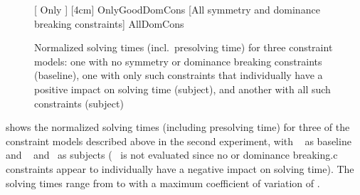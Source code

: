 
\begin{figure}
  \centering%

                      [%
                        Only
                      ]%
                      [4cm]%
                      {OnlyGoodDomCons}%
  \hfill%
                      [All symmetry and dominance breaking constraints]%
                      {AllDomCons}%

  \caption[%
            Plot for evaluating the impact on solving time made by different
            combinations of symmetry and dominance breaking constraints%
          ]%
          {%
            Normalized solving times (incl.\ presolving time) for three
            constraint models: one with no symmetry or dominance breaking
            constraints (baseline), one with only such constraints that
            individually have a positive impact on solving time (subject), and
            another with all such constraints (subject)%
          }
\end{figure}

 shows the normalized solving
times (including presolving time) for three of the \glspl{constraint model}
described above in the second experiment, with ~\modelC{} as \gls{baseline} and ~\modelD{}
and~\modelF{} as \glspl{subject} (~\modelE{} is not
evaluated since no  or \gls{dominance breaking.c}
\glspl{constraint} appear to individually have a negative impact on solving
time).
%
The solving times range from
\printMinSolvingTime{
  \SolvTechEnableOnlyGoodDomConsPrePlusSolvingTimeSpeedupNonePrePlusSolvingTimeAvgMin,
  \SolvTechEnableOnlyGoodDomConsPrePlusSolvingTimeSpeedupPrePlusSolvingTimeAvgMin,
  \SolvTechDisableAllDomConsPrePlusSolvingTimeSpeedupPrePlusSolvingTimeAvgMin
} to
\printMaxSolvingTime{
  \SolvTechEnableOnlyGoodDomConsPrePlusSolvingTimeSpeedupNonePrePlusSolvingTimeAvgMax,
  \SolvTechEnableOnlyGoodDomConsPrePlusSolvingTimeSpeedupPrePlusSolvingTimeAvgMax,
  \SolvTechDisableAllDomConsPrePlusSolvingTimeSpeedupPrePlusSolvingTimeAvgMax
} with a maximum coefficient of variation of
\numMaxOf{
  \SolvTechEnableOnlyGoodDomConsPrePlusSolvingTimeSpeedupNonePrePlusSolvingTimeCvMax,
  \SolvTechEnableOnlyGoodDomConsPrePlusSolvingTimeSpeedupPrePlusSolvingTimeCvMax,
  \SolvTechDisableAllDomConsPrePlusSolvingTimeSpeedupPrePlusSolvingTimeCvMax
}.

